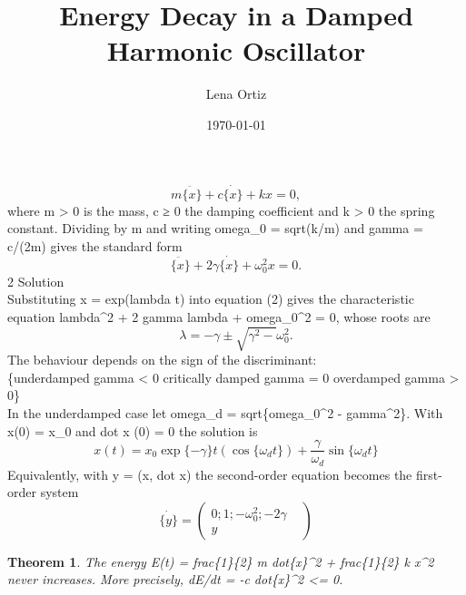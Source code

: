 \documentclass[11pt,a4paper]{article}
\title{Energy Decay in a Damped Harmonic Oscillator}
\author{Lena Ortiz}
\date{\today}
\newtheorem{theorem}{Theorem}
\begin{document}
\maketitle

\begin{equation}
  m\ddot{\{x\}}+c\dot{\{x\}}+kx=0,
\end{equation}
where m \textgreater{} 0 is the mass, c ≥ 0 the damping coefficient and k \textgreater{} 0 the spring constant. Dividing by m and writing omega\_0 = sqrt(k/m) and gamma = c/(2m) gives the standard form
\begin{equation}
  \ddot{\{x\}}+2\gamma\dot{\{x\}}+\omega_{0}^{2}x=0.
\end{equation}
2 Solution\\

Substituting x = exp(lambda t) into equation (2) gives the characteristic equation lambda\textasciicircum{}2 + 2 gamma lambda + omega\_0\textasciicircum{}2 = 0, whose roots are
\begin{equation}
  \lambda=-\gamma\pm\sqrt{\gamma^{2}-}\omega_{0}^{2}.
\end{equation}
The behaviour depends on the sign of the discriminant:
\\

\{underdamped gamma \textless{} 0
critically damped gamma = 0
overdamped gamma \textgreater{} 0\}
\\

In the underdamped case let omega\_d = sqrt\{omega\_0\textasciicircum{}2 - gamma\textasciicircum{}2\}. With x(0) = x\_0 and dot x (0) = 0 the solution is
\begin{equation}
  x(t)=x_{0}\exp\{-\gamma\}t(\cos\{\omega_{d}t\})+\frac{\gamma}{\omega_{d}}\sin\{\omega_{d}t\}
\end{equation}
Equivalently, with y = (x, dot x) the second-order equation becomes the first-order system
\begin{equation}
  \dot{\{y\}}=\begin{pmatrix}
0;1;-\omega_{0}^{2};-2\gamma &  \\
y & 
\end{pmatrix}
\end{equation}

\begin{theorem}
  The energy E(t) = frac\{1\}\{2\} m dot\{x\}\textasciicircum{}2 + frac\{1\}\{2\} k x\textasciicircum{}2 never increases. More precisely, dE/dt = -c dot\{x\}\textasciicircum{}2 \textless{}= 0.
\end{theorem}
\end{document}
